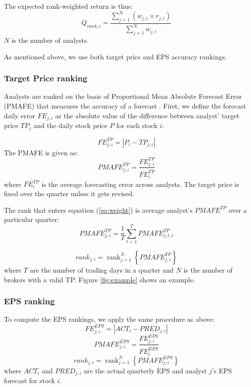 \documentclass{article}\usepackage[]{graphicx}\usepackage[]{color}
\DeclareMathOperator{\rank}{rank}
\begin{document}
The expected rank-weighted return is thus:
\begin{equation}
\label{rankq}
Q_{rank,i}=\frac{\sum_{j=1}^{N} (w_{j,i} \times r_{j,i})}{\sum_{j=1}^{N} w_{j,i}}
\end{equation}
$N$ is the number of analysts.

As mentioned above, we use both target price and EPS accuracy rankings.

\subsubsection{Target Price ranking} 
Analysts are ranked on the basis of Proportional Mean Absolute Forecast Error (PMAFE) that measures the accuracy of a forecast  \citep{clement1999,brown2001,ertimur2007}. First,  we define the forecast daily error  $FE_{j,i}$ as the absolute value of the difference between analyst' target price $TP_{j}$ and the daily stock price $P$ for each stock $i$:

\begin{equation}
\label{dfe}
FE_{j,i}^{TP}=|{P_{i}-TP_{j,i}}|
\end{equation}
The PMAFE is given as:
\begin{equation}
\label{tp:pmafe}
PMAFE_{j,i}^{TP}=\frac{FE_{j,i}^{TP}}{\overline{FE_{i}^{TP}}}
\end{equation}
where $\overline{{FE}_{i}^{TP}}$ is the average forecasting error across analysts. The target price is fixed over the quarter unless it gets revised.

The rank  that enters equation (\ref{eq:weight}) is average analyst's $PMAFE^{TP}$ over a particular quarter:
\begin{equation}
\overline{PMAFE_{j,i}^{TP}}=\frac{1}{T} \sum_{t=1}^{T} PMAFE_{j,t,i}^{TP}
\end{equation}

\begin{equation}
\label{tp:rank}
rank_{j,i}=\rank_{j=1}^{N} \left\{ \overline{PMAFE_{j,i}^{TP}} \right\}
\end{equation}
where $T$ are the number of trading days in a quarter and $N$ is the number of brokers with a valid TP.  Figure \ref{fig:example} shows an example.


\subsubsection{EPS ranking} 
To compute the EPS rankings, we apply the same procedure as above:
\begin{equation}
FE_{j,i}^{EPS}=|{ACT_{i}-PRED_{j,i}}|
\end{equation}
\begin{equation}
PMAFE_{j,i}^{EPS}= \frac{FE_{j,i}^{EPS}}{\overline{FE_{i}^{EPS}}}
\end{equation}
\begin{equation}
\label{eps:rank}
rank_{j,i}=\rank_{j=1}^{N} \left\{ PMAFE_{j,i}^{EPS} \right\} 
\end{equation}
where $ACT_{i}$ and $PRED_{j,i}$ are the actual quarterly EPS and  analyst $j$'s EPS forecast for stock $i$.
\end{document}
